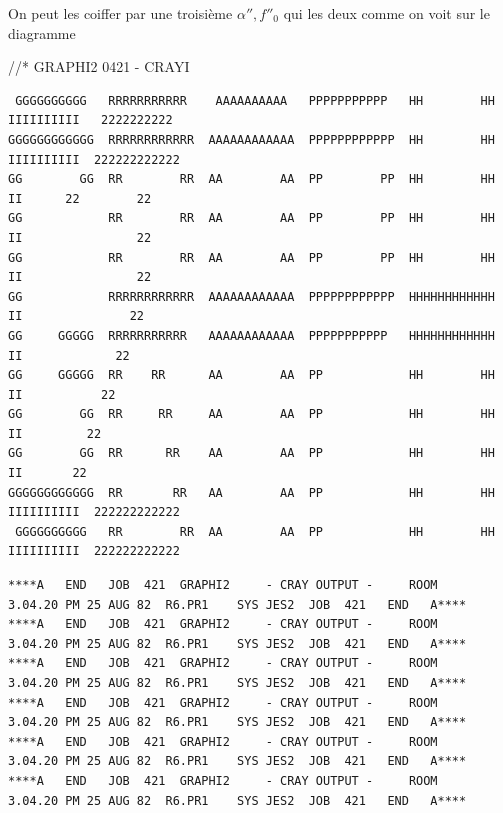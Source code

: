 
On peut les coiffer par une troisième  $\alpha'',f''_0$ qui   les deux comme on voit sur le diagramme




{\ttfamily //* \quad GRAPHI2 0421 \quad - CRAYI}

{\fontsize{4}{5}\selectfont
\begin{verbatim}
 GGGGGGGGGG   RRRRRRRRRRR    AAAAAAAAAA   PPPPPPPPPPP   HH        HH  IIIIIIIIII   2222222222
GGGGGGGGGGGG  RRRRRRRRRRRR  AAAAAAAAAAAA  PPPPPPPPPPPP  HH        HH  IIIIIIIIII  222222222222
GG        GG  RR        RR  AA        AA  PP        PP  HH        HH      II      22        22
GG            RR        RR  AA        AA  PP        PP  HH        HH      II                22
GG            RR        RR  AA        AA  PP        PP  HH        HH      II                22
GG            RRRRRRRRRRRR  AAAAAAAAAAAA  PPPPPPPPPPPP  HHHHHHHHHHHH      II               22
GG     GGGGG  RRRRRRRRRRR   AAAAAAAAAAAA  PPPPPPPPPPP   HHHHHHHHHHHH      II             22
GG     GGGGG  RR    RR      AA        AA  PP            HH        HH      II           22
GG        GG  RR     RR     AA        AA  PP            HH        HH      II         22
GG        GG  RR      RR    AA        AA  PP            HH        HH      II       22
GGGGGGGGGGGG  RR       RR   AA        AA  PP            HH        HH  IIIIIIIIII  222222222222
 GGGGGGGGGG   RR        RR  AA        AA  PP            HH        HH  IIIIIIIIII  222222222222
\end{verbatim}
}

{\fontsize{4}{5}\selectfont
\begin{verbatim}
****A   END   JOB  421  GRAPHI2     - CRAY OUTPUT -     ROOM        3.04.20 PM 25 AUG 82  R6.PR1    SYS JES2  JOB  421   END   A****
****A   END   JOB  421  GRAPHI2     - CRAY OUTPUT -     ROOM        3.04.20 PM 25 AUG 82  R6.PR1    SYS JES2  JOB  421   END   A****
****A   END   JOB  421  GRAPHI2     - CRAY OUTPUT -     ROOM        3.04.20 PM 25 AUG 82  R6.PR1    SYS JES2  JOB  421   END   A****
****A   END   JOB  421  GRAPHI2     - CRAY OUTPUT -     ROOM        3.04.20 PM 25 AUG 82  R6.PR1    SYS JES2  JOB  421   END   A****
****A   END   JOB  421  GRAPHI2     - CRAY OUTPUT -     ROOM        3.04.20 PM 25 AUG 82  R6.PR1    SYS JES2  JOB  421   END   A****
****A   END   JOB  421  GRAPHI2     - CRAY OUTPUT -     ROOM        3.04.20 PM 25 AUG 82  R6.PR1    SYS JES2  JOB  421   END   A****
\end{verbatim}
}

